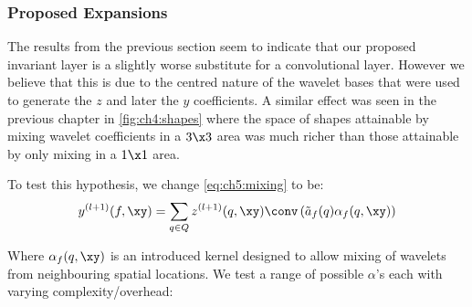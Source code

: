 \subsubsection{Proposed Expansions}\label{sec:ch5:mnist_initial}
The results from the previous section seem to indicate that
our proposed invariant layer is a slightly worse substitute for a convolutional
layer. However we believe that this is due to the centred nature of the wavelet bases that were
used to generate the $z$ and later the $y$ coefficients. A similar effect was seen
in the previous chapter in \autoref{fig:ch4:shapes} where the space of shapes
attainable by mixing wavelet coefficients in a $3\x 3$ area was much richer than
those attainable by only mixing in a $1\x 1$ area. 


To test this hypothesis, we change \autoref{eq:ch5:mixing} to be:
\begin{equation}
  y^{(l+1)}(f, \xy)  =  \sum_{q \in Q} z^{(l+1)}(q, \xy) \conv \left(\tilde{a}_f(q) \alpha_f(q, \xy) \right)
\end{equation}

Where $\alpha_f(q, \xy)$ is an introduced kernel designed to allow mixing of
wavelets from neighbouring spatial locations. We test a range of possible
$\alpha$'s each with varying complexity/overhead:

